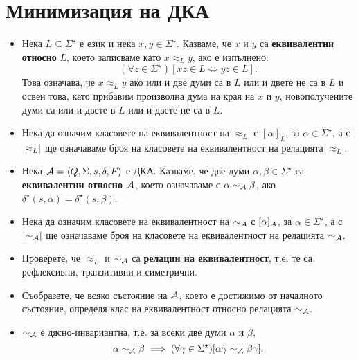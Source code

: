 \newpage
\section{Минимизация на ДКА}


\begin{itemize}
\item
  Нека $L \subseteq \Sigma^\star$ е език и нека $x,y \in \Sigma^\star$.
  Казваме, че $x$ и $y$ са {\bf еквивалентни относно} $L$, което записваме 
  като $x \approx_L y$, ако е изпълнено:
  \[(\forall z \in \Sigma^\star)[xz \in L \iff yz \in L].\]
  Това означава, че $x\approx_L y$ ако или и две думи са в $L$ или и двете не са в $L$
  и освен това, като прибавим произволна дума на края на $x$ и $y$, новополучените
  думи са или и двете в $L$ или и двете не са в $L$.  
\item
  Нека да означим класовете на еквивалентност на $\approx_L$ с $[\alpha]_L$, за $\alpha \in \Sigma^\star$,
  а с $\lvert{\approx_L}\rvert$ ще означаваме броя на класовете на еквивалентност на релацията $\approx_L$.
\item
  Нека $\mathcal{A} = \langle{Q,\Sigma,s,\delta,F}\rangle$ е ДКА.
  Казваме, че две думи $\alpha,\beta \in \Sigma^\star$ са {\bf еквивалентни относно $\mathcal{A}$},
  което означаваме с $\alpha \sim_{\mathcal{A}} \beta$, ако $\delta^\star(s,\alpha) = \delta^\star(s,\beta)$.
\item
  Нека да означим класовете на еквивалентност на $\sim_{\mathcal{A}}$ с $[\alpha]_{\mathcal{A}}$, за $\alpha \in \Sigma^\star$,
  а с $\lvert{\sim_{\mathcal{A}}}\rvert$ ще означаваме броя на класовете на еквивалентност на релацията $\sim_{\mathcal{A}}$.
\item
  Проверете, че $\approx_L$ и $\sim_{\mathcal{A}}$ са {\bf релации на еквивалентност}, т.е.
  те са рефлексивни, транзитивни и симетрични.
\item
  Съобразете, че всяко състояние на $\mathcal{A}$, което е достижимо от началното състояние, определя клас на еквивалентност относно 
  релацията $\sim_{\mathcal{A}}$.  
\item
  $\sim_{\mathcal{A}}$ е дясно-инвариантна, т.е. за всеки две думи $\alpha$ и $\beta$,
  \[\alpha \sim_{\mathcal{A}} \beta \implies (\forall \gamma\in\Sigma^\star)[\alpha\gamma \sim_{\mathcal{A}} \beta\gamma].\]
\end{itemize}

